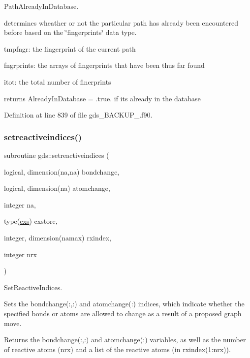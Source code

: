 Path\+Already\+In\+Database. 

determines wheather or not the particular path has already been encountered before based on the \char`\"{}fingerprints\char`\"{} data type.


\begin{DoxyItemize}
\item tmpfngr\+: the fingerprint of the current path
\item fngrprints\+: the arrays of fingerprints that have been thus far found
\item itot\+: the total number of finerprints
\item returns Already\+In\+Database = .true. if its already in the database 
\end{DoxyItemize}

Definition at line 839 of file gds\+\_\+\+B\+A\+C\+K\+U\+P\+\_.\+f90.

\mbox{\label{namespacegds_a0303bed58c58943730fddcabfe42aaa3}} 
\subsubsection{\texorpdfstring{setreactiveindices()}{setreactiveindices()}}
{\footnotesize\ttfamily subroutine gds\+::setreactiveindices (\begin{DoxyParamCaption}\item[{logical, dimension(na,na)}]{bondchange,  }\item[{logical, dimension(na)}]{atomchange,  }\item[{integer}]{na,  }\item[{type(\mbox{\hyperlink{structchemstr_1_1cxs}{cxs}})}]{cxstore,  }\item[{integer, dimension(namax)}]{rxindex,  }\item[{integer}]{nrx }\end{DoxyParamCaption})}



Set\+Reactive\+Indices. 

Sets the bondchange(\+:,\+:) and atomchange(\+:) indices, which indicate whether the specified bonds or atoms are allowed to change as a result of a proposed graph move.

Returns the bondchange(\+:,\+:) and atomchange(\+:) variables, as well as the number of reactive atoms (nrx) and a list of the reactive atoms (in rxindex(1\+:nrx)).


